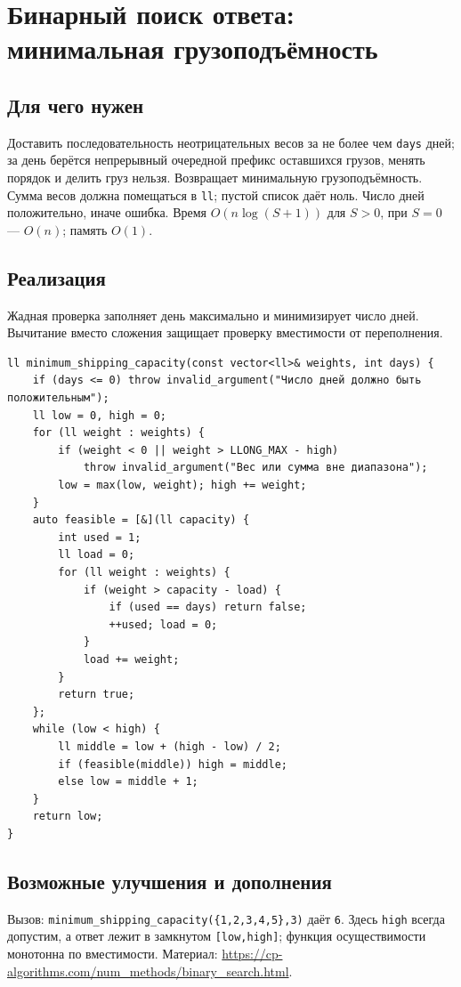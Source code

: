 \clearpage

\fi
\iffalse
\section{Бинарный поиск ответа: минимальная грузоподъёмность}
\subsection*{Для чего нужен}
Доставить последовательность неотрицательных весов за не более чем
\texttt{days} дней; за день берётся непрерывный очередной префикс оставшихся
грузов, менять порядок и делить груз нельзя. Возвращает минимальную
грузоподъёмность. Сумма весов должна помещаться в \texttt{ll}; пустой список
даёт ноль. Число дней положительно, иначе ошибка.
Время $O(n\log(S+1))$ для $S>0$, при $S=0$ --- $O(n)$; память $O(1)$.
\subsection*{Реализация}
Жадная проверка заполняет день максимально и минимизирует число дней.
Вычитание вместо сложения защищает проверку вместимости от переполнения.
\begin{lstlisting}[name=supplement_shipping]
ll minimum_shipping_capacity(const vector<ll>& weights, int days) {
    if (days <= 0) throw invalid_argument("Число дней должно быть положительным");
    ll low = 0, high = 0;
    for (ll weight : weights) {
        if (weight < 0 || weight > LLONG_MAX - high)
            throw invalid_argument("Вес или сумма вне диапазона");
        low = max(low, weight); high += weight;
    }
    auto feasible = [&](ll capacity) {
        int used = 1;
        ll load = 0;
        for (ll weight : weights) {
            if (weight > capacity - load) {
                if (used == days) return false;
                ++used; load = 0;
            }
            load += weight;
        }
        return true;
    };
    while (low < high) {
        ll middle = low + (high - low) / 2;
        if (feasible(middle)) high = middle;
        else low = middle + 1;
    }
    return low;
}
\end{lstlisting}
\subsection*{Возможные улучшения и дополнения}
Вызов: \texttt{minimum\_shipping\_capacity(\{1,2,3,4,5\},3)} даёт \texttt{6}.
Здесь \texttt{high} всегда допустим, а ответ лежит в замкнутом
\texttt{[low,high]}; функция осуществимости монотонна по вместимости.
Материал: \url{https://cp-algorithms.com/num_methods/binary_search.html}.

